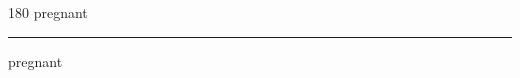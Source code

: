 
\begin{frame}
\begin{center}
\begin{turn}{180}
{\fontsize{2.5cm}{1em}\selectfont pregnant}
\end{turn}
\vspace{1em}\par  
\hrule
\vspace{1em}\par  
{\fontsize{2.5cm}{1em}\selectfont pregnant}
\end{center}
\end{frame}
